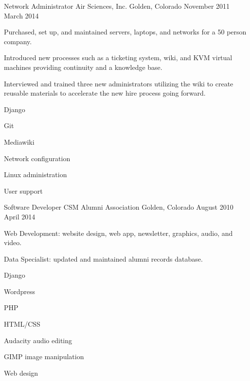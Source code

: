 \begin{cventries}
  \cventry%
    {Network Administrator} %
    {Air Sciences, Inc.} %
    {Golden, Colorado} %
    {November 2011 \- March 2014} %
    {%
      \begin{cvitems} %
        \item {Purchased, set up, and maintained servers, laptops, and networks for a 50 person company.}
        \item {Introduced new processes such as a ticketing system, wiki, and KVM virtual machines \- providing continuity and a knowledge base.}
        \item {Interviewed and trained three new administrators \- utilizing the wiki to create reusable materials to accelerate the new hire process going forward.}
      \end{cvitems}
    }
    \begin{cventryskills}
      \item Django
      \item Git
      \item Mediawiki
      \item Network configuration
      \item Linux administration
      \item User support
    \end{cventryskills}

  \cventry%
    {Software Developer} %
    {CSM Alumni Association} %
    {Golden, Colorado} %
    {August 2010 \- April 2014} %
    {%
      \begin{cvitems} %
        \item {Web Development: website design, web app, newsletter, graphics, audio, and video.}
        \item {Data Specialist: updated and maintained alumni records database.}
      \end{cvitems}
    }
    \begin{cventryskills}
      \item Django
      \item Wordpress
      \item PHP
      \item HTML/CSS
      \item Audacity audio editing
      \item GIMP image manipulation
      \item Web design
    \end{cventryskills}
\end{cventries}
